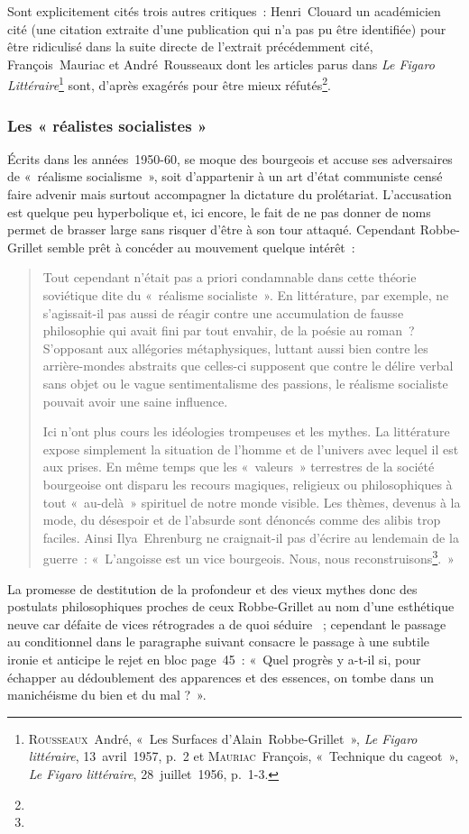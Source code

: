Sont explicitement cités trois autres critiques~: Henri~Clouard un académicien cité (une citation extraite d'une publication qui n'a pas pu être identifiée) pour être ridiculisé dans la suite directe de l'extrait précédemment cité, François~Mauriac et André~Rousseaux dont les articles parus dans \textit{Le Figaro Littéraire}\footnote{\textsc{Rousseaux}~André, «~Les Surfaces d’Alain~Robbe-Grillet~», \textit{Le Figaro littéraire}, 13~avril~1957, p.~2 et \textsc{Mauriac}~François, «~Technique du cageot~», \textit{Le Figaro littéraire}, 28~juillet~1956, p.~1-3.} sont, d'après \galia{} exagérés pour être mieux réfutés\footnote{}. 


\subsubsection{Les « réalistes socialistes »}
\label{engages}
Écrits dans les années~1950-60, \punr{} se moque des bourgeois et accuse ses adversaires de «~réalisme socialisme~», soit d'appartenir à un art d'état communiste censé faire advenir mais surtout accompagner la dictature du prolétariat. L'accusation est quelque peu hyperbolique et, ici encore, le fait de ne pas donner de noms permet de brasser large sans risquer d'être à son tour attaqué. Cependant Robbe-Grillet semble prêt à concéder au mouvement quelque intérêt~:
\begin{quote}
    Tout cependant n’était pas a priori condamnable dans cette théorie soviétique dite du «~réalisme socialiste~». En littérature, par exemple, ne s’agissait-il pas aussi de réagir contre une accumulation de fausse philosophie qui avait fini par tout envahir, de la poésie au roman~? S’opposant aux allégories métaphysiques, luttant aussi bien contre les arrière-mondes abstraits que celles-ci supposent que contre le délire verbal sans objet ou le vague sentimentalisme des passions, le réalisme socialiste pouvait avoir une saine influence.

    Ici n’ont plus cours les idéologies trompeuses et les mythes. La littérature expose simplement la situation de l’homme et de l’univers avec lequel il est aux prises. En même temps que les «~valeurs~» terrestres de la société bourgeoise ont disparu les recours magiques, religieux ou philosophiques à tout «~au-delà~» spirituel de notre monde visible. Les thèmes, devenus à la mode, du désespoir et de l’absurde sont dénoncés comme des alibis trop faciles. Ainsi Ilya~Ehrenburg ne craignait-il pas d’écrire au lendemain de la guerre~: «~L’angoisse est un vice bourgeois. Nous, nous reconstruisons\footnote{}.~»
\end{quote}
La promesse de destitution de la profondeur et des vieux mythes donc des postulats philosophiques proches de ceux Robbe-Grillet au nom d'une esthétique neuve car défaite de vices rétrogrades a de quoi séduire \robbe{}~; cependant le passage au conditionnel dans le paragraphe suivant consacre le passage à une subtile ironie et anticipe le rejet en bloc page~45~: «~Quel progrès y a-t-il si, pour échapper au dédoublement des apparences et des essences, on tombe dans un manichéisme du bien et du mal ?~».

